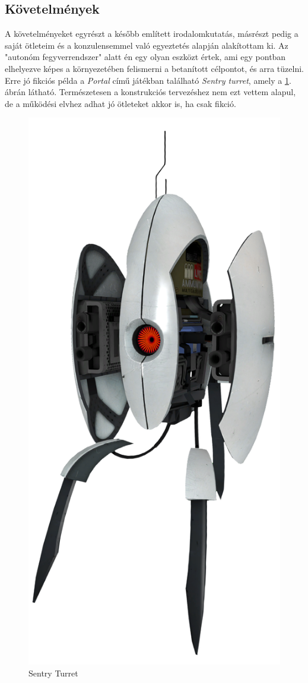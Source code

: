 \documentclass[12pt,a4paper]{article}
\begin{document}
\subsection{Követelmények}\label{sec:kov}

A követelményeket egyrészt a később említett irodalomkutatás, másrészt pedig a saját ötleteim és a konzulensemmel való egyeztetés alapján alakítottam ki. Az "autonóm fegyverrendszer" alatt én egy olyan eszközt értek, ami egy pontban elhelyezve képes a környezetében felismerni a betanított célpontot, és arra tüzelni. Erre jó fikciós példa a \textsl{Portal} című játékban található \textsl{Sentry turret}, amely a \ref{portalsentry}. ábrán látható. Természetesen a konstrukciós tervezéshez nem ezt vettem alapul, de a működési elvhez adhat jó ötleteket akkor is, ha csak fikció. \\

\begin{figure}
	\centering
	\includegraphics[width=0.8\linewidth]{portalsentry}
	\caption{Sentry Turret}
	\label{portalsentry}
\end{figure}
\end{document}
